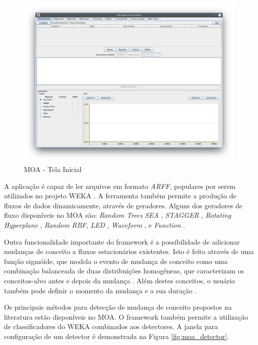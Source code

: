 \documentclass[qual, classic, a4paper]{ufbathesis}
\begin{document}
\begin{figure}[H]
\begin{center}
    \includegraphics[scale=0.4]{imagens/moa.png}
    \caption{MOA - Tela Inicial}
    \label{fig:moa}
\end{center}
\end{figure}

A aplicação é capaz de ler arquivos em formato \textit{ARFF}, populares por serem utilizados no projeto WEKA \cite{Hall:2009:WDM:1656274.1656278}.
A ferramenta também permite a produção de fluxos de dados dinamicamente, através de geradores.
Alguns dos geradores de fluxo disponíveis no MOA são:
\textit{Random Trees} \cite{Domingos:2000:MHD:347090.347107}
\textit{SEA} \cite{Street:2001:SEA:502512.502568}, 
\textit{STAGGER} \cite{Schlimmer1986}, 
\textit{Rotating Hyperplane} \cite{Wang:2003:MCD:956750.956778},
\textit{Random RBF}, 
\textit{LED} \cite{Gama:2003:ADT:956750.956813}, 
\textit{Waveform} \cite{Gama:2003:ADT:956750.956813}, 
 e \textit{Function} \cite{Jin:2003:EDT:956750.956821}.

Outra funcionalidade importante do framework é a possibilidade de adicionar mudanças de conceito a fluxos estacionários existentes.
Isto é feito através de uma função sigmóide, que modela o evento de mudança de conceito como uma combinação balanceada de duas distribuições homogêneas, 
que caracterizam os conceitos-alvo antes e depois da mudança \cite{bifet2009data}.
Além destes conceitos, o usuário também pode definir o momento da mudança e a sua duração \cite{Bifet:2010:MMO:1756006.1859903}.

Os principais métodos para detecção de mudança de conceito propostos na literatura estão disponíveis no MOA.
O framework também permite a utilização de classificadores do WEKA \cite{Hall:2009:WDM:1656274.1656278} combinados aos detectores.
A janela para configuração de um detector é demonstrada na Figura \ref{fig:moa_detector}.
\end{document}
